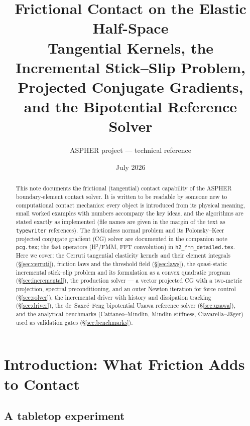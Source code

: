 \documentclass[11pt,a4paper]{article}
\newcommand{\code}[1]{\texttt{#1}}
\begin{document}
\title{\textbf{Frictional Contact on the Elastic Half-Space}\\[0.5em]
       \large Tangential Kernels, the Incremental Stick--Slip Problem,\\
       Projected Conjugate Gradients, and the Bipotential Reference Solver}
\author{ASPHER project --- technical reference}
\date{July 2026}
\maketitle

\begin{abstract}
\noindent
This note documents the frictional (tangential) contact capability of the
ASPHER boundary-element contact solver. It is written to be readable by
someone new to computational contact mechanics: every object is introduced
from its physical meaning, small worked examples with numbers accompany the
key ideas, and the algorithms are stated exactly as implemented (file names
are given in the margin of the text as \code{typewriter} references). The
frictionless normal problem and its Polonsky--Keer projected conjugate
gradient (CG) solver are documented in the companion note \code{pcg.tex};
the fast operators (H$^2$/FMM, FFT convolution) in
\code{h2\_fmm\_detailed.tex}. Here we cover: the Cerruti tangential
elasticity kernels and their element integrals
(\S\ref{sec:cerruti}), friction laws and the threshold field
(\S\ref{sec:laws}), the quasi-static incremental stick--slip problem and its
formulation as a convex quadratic program (\S\ref{sec:incremental}), the
production solver --- a vector projected CG with a two-metric projection,
spectral preconditioning, and an outer Newton iteration for force control
(\S\ref{sec:solver}), the incremental driver with history and dissipation
tracking (\S\ref{sec:driver}), the de~Saxc\'e--Feng bipotential Uzawa
reference solver (\S\ref{sec:uzawa}), and the analytical benchmarks
(Cattaneo--Mindlin, Mindlin stiffness, Ciavarella--J\"ager) used as
validation gates (\S\ref{sec:benchmarks}).
\end{abstract}

\tableofcontents

\section{Introduction: What Friction Adds to Contact}
\label{sec:intro}

\subsection{A tabletop experiment}
\end{document}
